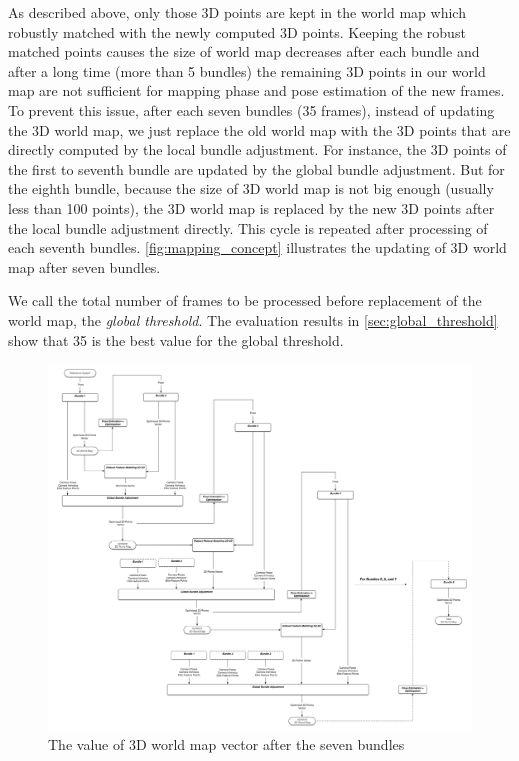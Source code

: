 As described above, only those 3D points are kept in the world map which robustly matched with the newly computed 3D points. Keeping the robust matched points causes the size of world map decreases after each bundle and after a long time (more than 5 bundles) the remaining 3D points in our world map are not sufficient for mapping phase and pose estimation of the new frames. To prevent this issue, after each seven bundles (35 frames), instead of updating the 3D world map, we just replace the old world map with the 3D points that are directly computed by the local bundle adjustment. For instance, the 3D points of the first to seventh bundle are updated by the global bundle adjustment. But for the eighth bundle, because the size of 3D world map is not big enough (usually less than 100 points), the 3D world map is replaced by the new 3D points after the local bundle adjustment directly. This cycle is repeated after processing of each seventh bundles. \autoref{fig:mapping_concept} illustrates the updating of 3D world map after seven bundles. 

We call the total number of frames to be processed before replacement of the world map, the \textit{global threshold}. The evaluation results in \autoref{sec:global_threshold} show that 35 is the best value for the global threshold.

\begin{figure}[H]
  \centering
  \includegraphics[width=150mm]{figures/mapping}
  \caption{The value of 3D world map vector after the seven bundles}\label{fig:mapping_concept}
\end{figure}

